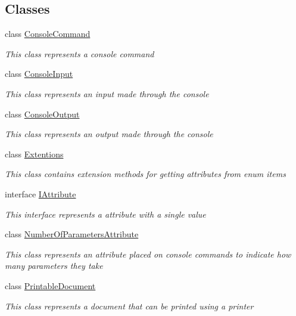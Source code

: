 \subsection*{Classes}
\begin{DoxyCompactItemize}
\item 
class \hyperlink{class_c_p_u___o_s___simulator_1_1_console_1_1_console_command}{Console\+Command}
\begin{DoxyCompactList}\small\item\em This class represents a console command \end{DoxyCompactList}\item 
class \hyperlink{class_c_p_u___o_s___simulator_1_1_console_1_1_console_input}{Console\+Input}
\begin{DoxyCompactList}\small\item\em This class represents an input made through the console \end{DoxyCompactList}\item 
class \hyperlink{class_c_p_u___o_s___simulator_1_1_console_1_1_console_output}{Console\+Output}
\begin{DoxyCompactList}\small\item\em This class represents an output made through the console \end{DoxyCompactList}\item 
class \hyperlink{class_c_p_u___o_s___simulator_1_1_console_1_1_extentions}{Extentions}
\begin{DoxyCompactList}\small\item\em This class contains extension methods for getting attributes from enum items \end{DoxyCompactList}\item 
interface \hyperlink{interface_c_p_u___o_s___simulator_1_1_console_1_1_i_attribute}{I\+Attribute}
\begin{DoxyCompactList}\small\item\em This interface represents a attribute with a single value \end{DoxyCompactList}\item 
class \hyperlink{class_c_p_u___o_s___simulator_1_1_console_1_1_number_of_parameters_attribute}{Number\+Of\+Parameters\+Attribute}
\begin{DoxyCompactList}\small\item\em This class represents an attribute placed on console commands to indicate how many parameters they take \end{DoxyCompactList}\item 
class \hyperlink{class_c_p_u___o_s___simulator_1_1_console_1_1_printable_document}{Printable\+Document}
\begin{DoxyCompactList}\small\item\em This class represents a document that can be printed using a printer \end{DoxyCompactList}\end{DoxyCompactItemize}
